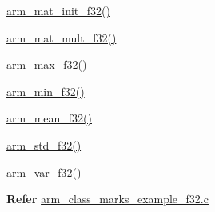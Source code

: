 \begin{DoxyParagraph}{}

\begin{DoxyItemize}
\item \hyperlink{group___matrix_init_ga11e3dc41592a6401c13182fef9416a27}{arm\-\_\-mat\-\_\-init\-\_\-f32()}
\item \hyperlink{group___matrix_mult_ga917bf0270310c1d3f0eda1fc7c0026a0}{arm\-\_\-mat\-\_\-mult\-\_\-f32()}
\item \hyperlink{group___max_ga5b89d1b04575aeec494f678695fb87d8}{arm\-\_\-max\-\_\-f32()}
\item \hyperlink{group___min_gaf62b1673740fc516ea64daf777b7d74a}{arm\-\_\-min\-\_\-f32()}
\item \hyperlink{group__mean_ga74ce08c49ab61e57bd50c3a0ca1fdb2b}{arm\-\_\-mean\-\_\-f32()}
\item \hyperlink{group___s_t_d_ga4969b5b5f3d001377bc401a3ee99dfc2}{arm\-\_\-std\-\_\-f32()}
\item \hyperlink{group__variance_ga393f26c5a3bfa05624fb8d32232a6d96}{arm\-\_\-var\-\_\-f32()}
\end{DoxyItemize}
\end{DoxyParagraph}
{\bfseries  Refer } \hyperlink{arm_class_marks_example_f32_8c-example}{arm\-\_\-class\-\_\-marks\-\_\-example\-\_\-f32.\-c} 